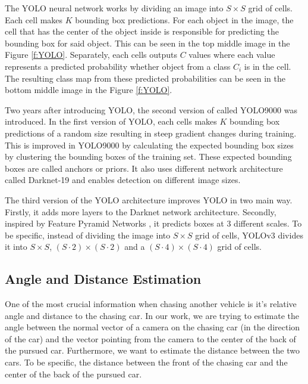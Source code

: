 The YOLO neural network works by dividing an image into $S\times S$ grid of cells. Each cell makes $K$ bounding box predictions. For each object in the image, the cell that has the center of the object inside is responsible for predicting the bounding box for said object. This can be seen in the top middle image in the Figure \ref{f:YOLO}. Separately, each cells outputs $C$ values where each value represents a predicted probability whether object from a class $C_i$ is in the cell. The resulting class map from these predicted probabilities can be seen in the bottom middle image in the Figure \ref{f:YOLO}. 
\par
Two years after introducing YOLO, the second version of called YOLO9000 \cite{YOLO9000} was introduced.  In the first version of YOLO, each cells makes $K$ bounding box predictions of a random size resulting in steep gradient changes during training. %
This is improved in YOLO9000 by calculating the expected bounding box sizes by clustering the bounding boxes of the training set. These expected bounding boxes are called anchors or priors. It also uses different network architecture called Darknet-19 and enables detection on different image sizes. \par

The third version of the YOLO architecture improves YOLO in two main way. Firstly, it adds more layers to the Darknet network architecture. Secondly, inspired by Feature Pyramid Networks \cite{FPN}, it predicts boxes at 3 different scales. To be specific, instead of dividing the image into $S\times S$ grid of cells, YOLOv3 divides it into $S\times S$, $(S\cdot2)\times (S\cdot2)$ and a $(S\cdot4)\times (S\cdot4)$ grid of cells.


\subsection{Angle and Distance Estimation}
One of the most crucial information when chasing another vehicle is it's relative angle and distance to the chasing car. In our work, we are trying to estimate the angle between the normal vector of a camera on the chasing car (in the direction of the car) and the vector pointing from the camera to the center of the back of the pursued car. Furthermore, we want to estimate the distance between the two cars. To be specific, the distance between the front of the chasing car and the center of the back of the pursued car.

